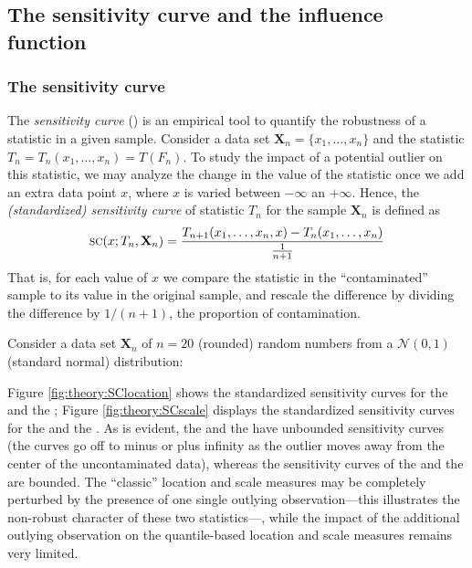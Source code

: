 \subsection{The sensitivity curve and the influence function}
\label{subsec:theory:IF}

\subsubsection{The sensitivity curve}

The \textit{sensitivity curve} () is an empirical tool to quantify the
robustness of a statistic in a given sample. Consider a data set
$\mathbf{X}_n = \{x_1, \dots, x_n\}$ and the statistic $T_n =
T_n(x_1, \dots, x_n) = T(F_n)$. To study the impact of a potential
outlier on this statistic, we may analyze the change in the value of the
statistic once we add an extra data point $x$, where $x$ is varied between
$-\infty$ an $+\infty$. Hence, the \emph{(standardized) sensitivity curve} of
statistic $T_n$ for the sample $\mathbf{X}_n$ is defined as
\[
    \stsc{SC}(x; T_n, \mathbf{X}_n) = 
    \frac{T_{n+1}(x_1, \dots, x_n, x) - T_n(x_1, \dots, x_n)}{\frac{1}{n+1}}
\]
That is, for each value of $x$ we compare the statistic in the “contaminated”
sample to its value in the original sample, and rescale the difference by
dividing the difference by $1/(n+1)$, the proportion of contamination.

\begin{stexample}
Consider a data set $\mathbf{X}_n$ of $n=20$ (rounded) random numbers from a
$\mathcal{N}(0,1)$ (standard normal) distribution:


Figure \ref{fig:theory:SClocation} shows the standardized sensitivity curves
for the  and the ; Figure \ref{fig:theory:SCscale}
displays the standardized sensitivity curves for the 
and the . As is evident, the  and the
 have unbounded sensitivity curves (the curves go off
to minus or plus infinity as the outlier moves away from the center of
the uncontaminated data), whereas the sensitivity curves of the 
and the  are bounded. The “classic” location and
scale measures may be completely perturbed by the presence of one single
outlying observation---this illustrates the non-robust character of these two
statistics---, while the impact of the additional outlying observation on the
quantile-based location and scale measures remains very limited.
\end{stexample}


